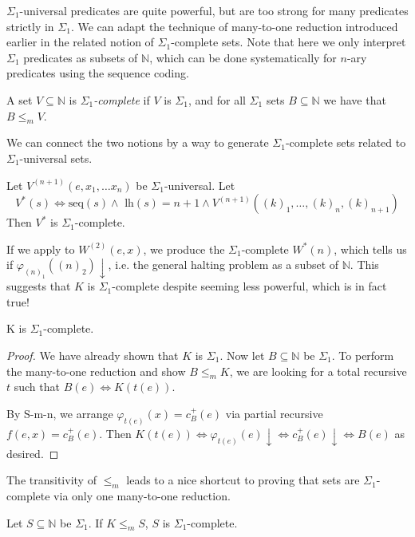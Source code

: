 $\Sigma_1$-universal predicates are quite powerful, but are too strong for many predicates strictly in $\Sigma_1$. We can adapt the technique of many-to-one reduction introduced earlier in the related notion of $\Sigma_1$-complete sets. Note that here we only interpret $\Sigma_1$ predicates as subsets of $\mathbb{N}$, which can be done systematically for $n$-ary predicates using the sequence coding.

\begin{definition}
A set $V \subseteq \mathbb{N}$ is $\Sigma_1$\textit{-complete} if $V$ is $\Sigma_1$, and for all $\Sigma_1$ sets $B \subseteq \mathbb{N}$ we have that $B \leq_m V$.
\end{definition}

We can connect the two notions by a way to generate $\Sigma_1$-complete sets related to $\Sigma_1$-universal sets.

\begin{proposition}\label{producing-sigma-1-complete}
Let $V^{(n+1)}(e, x_1, \ldots x_n)$ be $\Sigma_1$-universal. Let \[
V^*(s) \iff \text{seq}(s) \land \text{ lh}(s) = n+1 \land V^{(n+1)}((k)_1, \ldots, (k)_n, (k)_{n+1})
\]
Then $V^*$ is $\Sigma_1$-complete.
\end{proposition}

If we apply  to $W^{(2)}(e, x)$, we produce the $\Sigma_1$-complete $W^*(n)$, which tells us if $\varphi_{(n)_1}\left((n)_2\right) \downarrow$, i.e. the general halting problem as a subset of $\mathbb{N}$. This suggests that $K$ is $\Sigma_1$-complete despite seeming less powerful, which is in fact true!

\begin{proposition}
K is $\Sigma_1$-complete.
\end{proposition}
\begin{proof}
We have already shown that $K$ is $\Sigma_1$. Now let $B \subseteq \mathbb{N}$ be $\Sigma_1$. To perform the many-to-one reduction and show $B \leq_m K$, we are looking for a total recursive $t$ such that $B(e) \iff K(t(e))$.

By S-m-n, we arrange $\varphi_{t(e)}(x) = c_B^+(e)$ via partial recursive $f(e, x) = c_B^+(e)$. Then $K(t(e)) \iff \varphi_{t(e)}(e) \downarrow \iff c_B^+(e) \downarrow \iff B(e)$ as desired.
\end{proof}
The transitivity of $\leq_m$ leads to a nice shortcut to proving that sets are $\Sigma_1$-complete via only one many-to-one reduction.
\begin{proposition}
Let $S \subseteq \mathbb{N}$ be $\Sigma_1$. If $K \leq_m S$, $S$ is $\Sigma_1$-complete.
\end{proposition}

